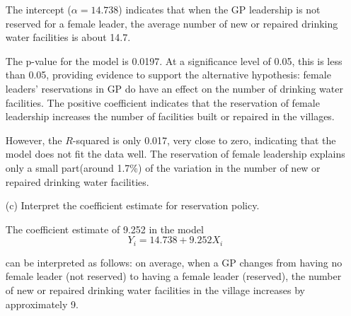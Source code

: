 \documentclass[12pt,letterpaper]{article}
\begin{document}
\begin{enumerate}
		The intercept (\(\alpha = 14.738\)) indicates that when the GP leadership is not reserved for a female leader, the average number of new or repaired drinking water facilities is about 14.7.
		
		The p-value for the model is 0.0197. At a significance level of 0.05, this is less than 0.05, providing evidence to support the alternative hypothesis: female leaders' reservations in GP do have an effect on the number of drinking water facilities. The positive coefficient indicates that the reservation of female leadership increases the number of facilities built or repaired in the villages.
		
		However, the \(R\)-squared is only 0.017, very close to zero, indicating that the model does not fit the data well. The reservation of female leadership explains only a small part(around 1.7\%) of the variation in the number of new or repaired drinking water facilities.
		
		\item [(c)] Interpret the coefficient estimate for reservation policy.
		
		The coefficient estimate of 9.252 in the model
		\[
		Y_i = 14.738 + 9.252 X_i
		\]
		
		can be interpreted as follows: on average, when a GP changes from having no female leader (not reserved) to having a female leader (reserved), the number of new or repaired drinking water facilities in the village increases by approximately 9.
		
	\end{enumerate}
	
\end{document}
